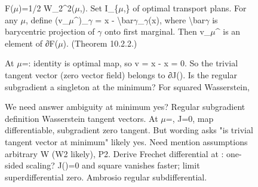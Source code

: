 \begin{figure}[t]
\begin{reasoncol}[equal height group=reasX3]
\end{reasoncol}\hspace{\columnsep}%
\begin{reasoncol}[equal height group=reasX3]
  \par\vspace{1pt}
  \caret{}\par\vspace{4pt}
  \raggedright {} F(\(\mu\))=1/2 W\_2\textasciicircum{}2(\(\mu\),). Set I\_\{\(\mu\),\} of optimal transport plans. For any \(\mu\), define (v\_\(\mu\)\textasciicircum{})\_\(\gamma\) = x - \textbackslash{}bar\(\gamma\)\_\(\gamma\)(x), where \textbackslash{}bar\(\gamma\) is barycentric projection of \(\gamma\) onto first marginal. Then v\_\(\mu\)\textasciicircum{} is an element of ∂F(\(\mu\)). (Theorem 10.2.2.)\par
  At \(\mu\)=: identity is optimal map, so v = x - x = 0. So the trivial tangent vector (zero vector field) belongs to ∂J(). Is the regular subgradient a singleton at the minimum? For squared Wasserstein,\par\vspace{3pt}\elide
\end{reasoncol}\hspace{\columnsep}%
\begin{reasoncol}[equal height group=reasX3]
  \par\vspace{1pt}
  \caret{}\par\vspace{4pt}
  \raggedright We need answer ambiguity at minimum yes? Regular subgradient definition Wasserstein tangent vectors. At \(\mu\)=, J=0, map differentiable, subgradient zero tangent. But wording asks "is trivial tangent vector at minimum" likely yes. Need mention assumptions arbitrary W (W2 likely), P2. Derive Frechet differential at : one-sided scaling? J()=0 and square vanishes faster; limit superdifferential zero. Ambrosio regular subdifferential.\par\vspace{3pt}\elide
\end{reasoncol}\par
\vspace{12pt}
\noindent
\begin{answercol}[equal height group=ansX3]
  \caret{}\par\vspace{4pt}

\end{answercol}
\end{figure}
